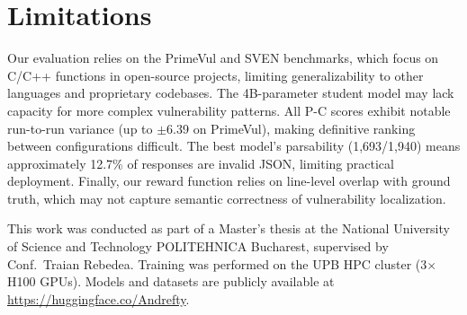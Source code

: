 \documentclass{article}
\begin{document}
\section{Limitations}

Our evaluation relies on the PrimeVul and SVEN benchmarks, which focus on C/C++ functions in open-source projects, limiting generalizability to other languages and proprietary codebases. The 4B-parameter student model may lack capacity for more complex vulnerability patterns. All P-C scores exhibit notable run-to-run variance (up to $\pm$6.39 on PrimeVul), making definitive ranking between configurations difficult. The best model's parsability (1,693/1,940) means approximately 12.7\% of responses are invalid JSON, limiting practical deployment. Finally, our reward function relies on line-level overlap with ground truth, which may not capture semantic correctness of vulnerability localization.

\begin{ack}
This work was conducted as part of a Master's thesis at the National University of Science and Technology POLITEHNICA Bucharest, supervised by Conf.\ Traian Rebedea. Training was performed on the UPB HPC cluster (3$\times$H100 GPUs). Models and datasets are publicly available at \url{https://huggingface.co/Andrefty}.
\end{ack}

\small{


}
\end{document}
